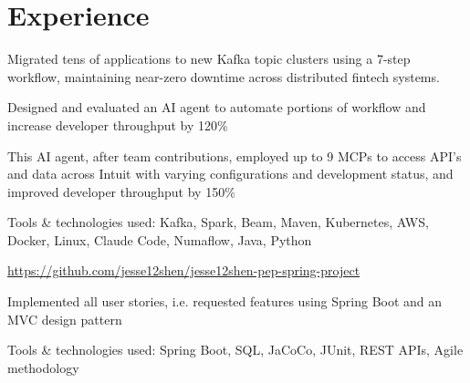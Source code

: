 
    
    \section*{\textbf{Experience}}
\resumeSubHeadingListStart
     \resumeItemListStart
    \item {Migrated tens of applications to new Kafka topic clusters using a 7-step workflow, maintaining near-zero downtime across distributed fintech systems.}
    \item {Designed and evaluated an AI agent to automate portions of workflow and increase developer throughput by 120\%}
    \item {This AI agent, after team contributions, employed up to 9 MCPs to access API's and data across Intuit with varying configurations and development status, and improved developer throughput by 150\%}
    \item {Tools \& technologies used: Kafka, Spark, Beam, Maven, Kubernetes, AWS, Docker, Linux, Claude Code, Numaflow, Java, Python}
    \resumeItemListEnd
      \resumeItemListStart
      \item \textcolor{blue}{{\url{https://github.com/jesse12shen/jesse12shen-pep-spring-project}}} 
    \item{Implemented all user stories, i.e. requested features using Spring Boot and an MVC design pattern}
    \item {Tools \& technologies used: Spring Boot, SQL, JaCoCo, JUnit, REST APIs, Agile methodology}
    \resumeItemListEnd





